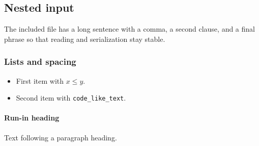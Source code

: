 \subsection{Nested input}
The included file has a long sentence with a comma, a second clause, and a final phrase so that reading and serialization stay stable.

\subsubsection{Lists and spacing}
\begin{itemize}
\item First item with $x \leq y$.
\item Second item with \texttt{code\_like\_text}.
\end{itemize}

\paragraph{Run-in heading} Text following a paragraph heading.
